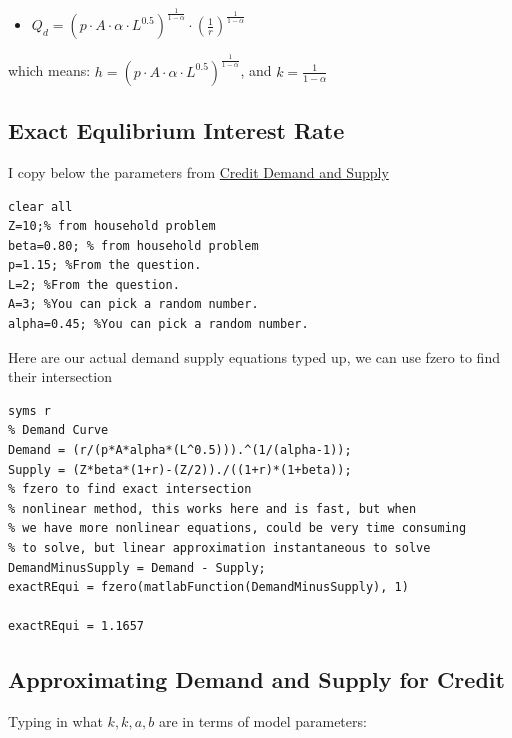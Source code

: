 \documentclass[
]{book}
\providecommand{\tightlist}{%
  \setlength{\itemsep}{0pt}\setlength{\parskip}{0pt}}
\begin{document}
\begin{itemize}
\tightlist
\item
  \(\displaystyle Q_d ={\left(p\cdot A\cdot \alpha \cdot L^{0.5} \right)}^{\frac{1}{1-\alpha }} \cdot {\left(\frac{1}{r}\right)}^{\frac{1}{1-\alpha }}\)
\end{itemize}

which means:
\(h={\left(p\cdot A\cdot \alpha \cdot L^{0.5} \right)}^{\frac{1}{1-\alpha }}\),
and \(k=\frac{1}{1-\alpha }\)

\hypertarget{exact-equlibrium-interest-rate}{%
\subsection{Exact Equlibrium Interest Rate}\label{exact-equlibrium-interest-rate}}

I copy below the parameters from \href{https://math4econ.github.io/derivative_application/K_borrow_firm.html}{Credit Demand and
Supply}

\begin{verbatim}
clear all
Z=10;% from household problem
beta=0.80; % from household problem
p=1.15; %From the question.
L=2; %From the question.
A=3; %You can pick a random number.
alpha=0.45; %You can pick a random number.
\end{verbatim}

Here are our actual demand supply equations typed up, we can use fzero
to find their intersection

\begin{verbatim}
syms r
% Demand Curve
Demand = (r/(p*A*alpha*(L^0.5))).^(1/(alpha-1));
Supply = (Z*beta*(1+r)-(Z/2))./((1+r)*(1+beta));
% fzero to find exact intersection
% nonlinear method, this works here and is fast, but when 
% we have more nonlinear equations, could be very time consuming 
% to solve, but linear approximation instantaneous to solve
DemandMinusSupply = Demand - Supply;
exactREqui = fzero(matlabFunction(DemandMinusSupply), 1)

exactREqui = 1.1657
\end{verbatim}

\hypertarget{approximating-demand-and-supply-for-credit}{%
\subsection{Approximating Demand and Supply for Credit}\label{approximating-demand-and-supply-for-credit}}

Typing in what \(k,k,a,b\) are in terms of model parameters:
\end{document}
